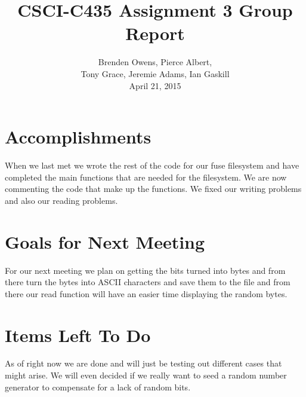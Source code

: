 \documentclass[12pt, letterpaper, notitlepage]{paper}
\title{CSCI-C435 Assignment 3 Group Report}
\author{Brenden Owens, Pierce Albert, \\
Tony Grace, Jeremie Adams, Ian Gaskill
\\April 21, 2015}
\begin{document}
\maketitle

\section{Accomplishments}
When we last met we wrote the rest of the code for our fuse filesystem and have completed the main functions that are needed for the filesystem. We are now commenting the code that make up the functions. We fixed our writing problems and also our reading problems.   
\section{Goals for Next Meeting}
For our next meeting we plan on getting the bits turned into bytes and from there turn the bytes into ASCII characters and save them to the file and from there our read function will have an easier time displaying the random bytes.
\section{Items Left To Do}
As of right now we are done and will just be testing out different cases that might arise. We will even decided if we really want to seed a random number generator to compensate for a lack of random bits.  
\end{document}
